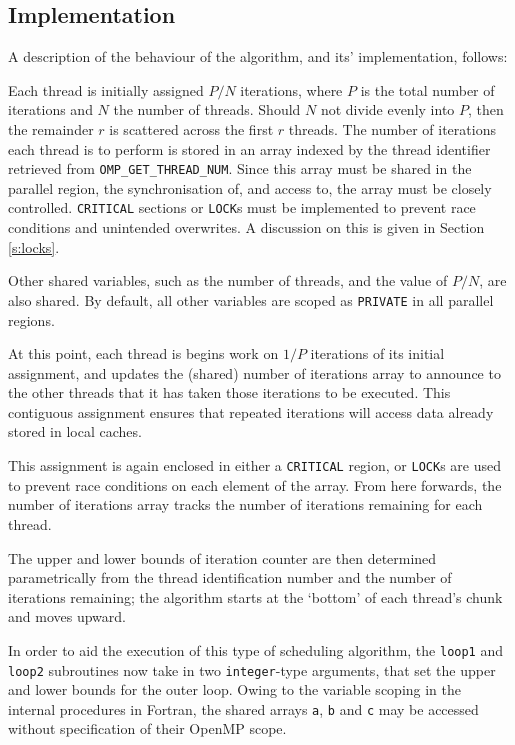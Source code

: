 \documentclass{article} %
\newcommand{\tp}{\texttt}
\begin{document}
\subsection*{Implementation}

A description of the behaviour of the algorithm, and its' implementation, follows:

Each thread is initially assigned $P/N$ iterations, where $P$ is the total number of iterations and $N$ the number of threads. 
Should $N$ not divide evenly into $P$, then the remainder $r$ is scattered across the first $r$ threads.
The number of iterations each thread is to perform is stored in an array indexed by the thread identifier retrieved from \tp{OMP\_GET\_THREAD\_NUM}.
Since this array must be shared in the parallel region, the synchronisation of, and access to, the array must be closely controlled.
\tp{CRITICAL} sections or \tp{LOCK}s must be implemented to prevent race conditions and unintended overwrites.
A discussion on this is given in Section \ref{s:locks}.

Other shared variables, such as the number of threads, and the value of $P/N$, are also shared.
By default, all other variables are scoped as \tp{PRIVATE} in all parallel regions.

At this point, each thread is begins work on $1/P$ iterations of its initial assignment, and updates the (shared) number of iterations array to announce to the other threads that it has taken those iterations to be executed.
This contiguous assignment ensures that repeated iterations will access data already stored in local caches.

This assignment is again enclosed in either a \tp{CRITICAL} region, or \tp{LOCK}s are used to prevent race conditions on each element of the array.
From here forwards, the number of iterations array tracks the number of iterations remaining for each thread.

The upper and lower bounds of iteration counter are then determined parametrically from the thread identification number and the number of iterations remaining; the algorithm starts at the `bottom' of each thread's chunk and moves upward.

In order to aid the execution of this type of scheduling algorithm, the \tp{loop1} and \tp{loop2} subroutines now take in two \tp{integer}-type arguments, that set the upper and lower bounds for the outer loop.
Owing to the variable scoping in the internal procedures in Fortran, the shared arrays \tp{a}, \tp{b} and \tp{c} may be accessed without specification of their OpenMP scope.
\end{document}
